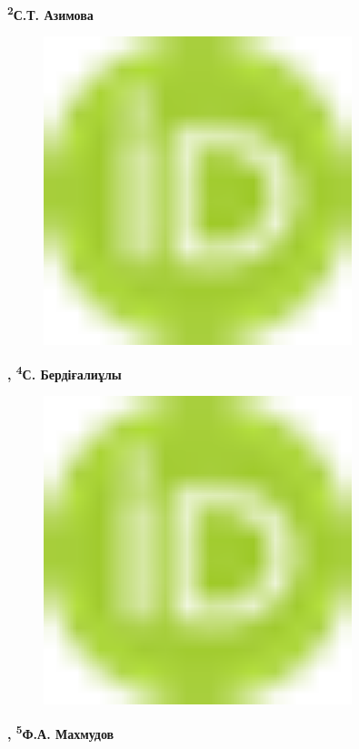 {\bfseries \textsuperscript{2}С.Т.
Азимова}
\begin{figure}[H]
	\centering
	\includegraphics[width=0.8\textwidth]{media/pish/image10}
	\caption*{}
\end{figure}
{\bfseries ,
\textsuperscript{4}С.
Бердіғалиұлы}
\begin{figure}[H]
	\centering
	\includegraphics[width=0.8\textwidth]{media/pish/image10}
	\caption*{}
\end{figure}
{\bfseries ,
\textsuperscript{5}Ф.А.
Махмудов}
